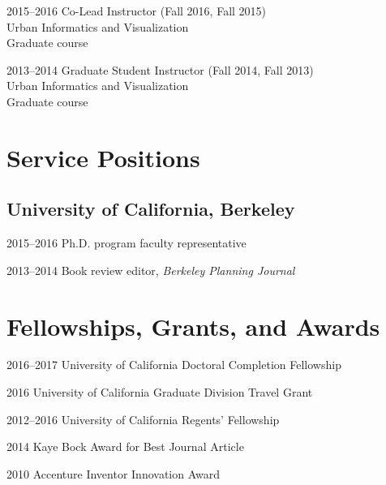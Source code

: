\documentclass{academiccv}
\begin{document}
\begin{tablist}
\item[2015--2016] \tab Co-Lead Instructor (Fall 2016, Fall 2015) \\
                       Urban Informatics and Visualization \\
                       Graduate course
\item[2013--2014] \tab Graduate Student Instructor (Fall 2014, Fall 2013) \\
                       Urban Informatics and Visualization \\
                       Graduate course
\end{tablist}



\section*{Service Positions}

\subsection*{University of California, Berkeley}

\begin{tablist}
\item[2015--2016] \tab Ph.D. program faculty representative
\item[2013--2014] \tab Book review editor, \emph{Berkeley Planning Journal}
\end{tablist}


\section*{Fellowships, Grants, and Awards}

\begin{tablist}
\item[2016--2017] \tab University of California Doctoral Completion Fellowship
\item[2016]       \tab University of California Graduate Division Travel Grant
\item[2012--2016] \tab University of California Regents' Fellowship
\item[2014]       \tab Kaye Bock Award for Best Journal Article
\item[2010]       \tab Accenture Inventor Innovation Award
\end{tablist}
\end{document}
